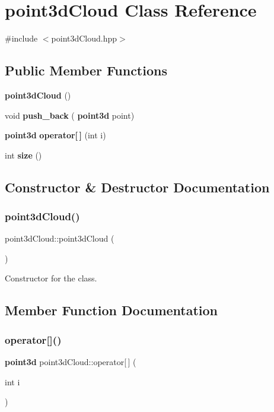 \section{point3d\+Cloud Class Reference}
\label{classpoint3d_cloud}


{\ttfamily \#include $<$point3d\+Cloud.\+hpp$>$}

\subsection*{Public Member Functions}
\begin{DoxyCompactItemize}
\item 
\textbf{ point3d\+Cloud} ()
\item 
void \textbf{ push\+\_\+back} (\textbf{ point3d} point)
\item 
\textbf{ point3d} \textbf{ operator[$\,$]} (int i)
\item 
int \textbf{ size} ()
\end{DoxyCompactItemize}


\subsection{Constructor \& Destructor Documentation}
\mbox{\label{classpoint3d_cloud_a9997a8eba3508097aed26dd3dc8c12a0}} 
\subsubsection{point3d\+Cloud()}
{\footnotesize\ttfamily point3d\+Cloud\+::point3d\+Cloud (\begin{DoxyParamCaption}{ }\end{DoxyParamCaption})}

Constructor for the class. 

\subsection{Member Function Documentation}
\mbox{\label{classpoint3d_cloud_ab39c301d72157f68789b2fda42636432}} 
\subsubsection{operator[]()}
{\footnotesize\ttfamily \textbf{ point3d} point3d\+Cloud\+::operator[$\,$] (\begin{DoxyParamCaption}\item[{int}]{i }\end{DoxyParamCaption})}

